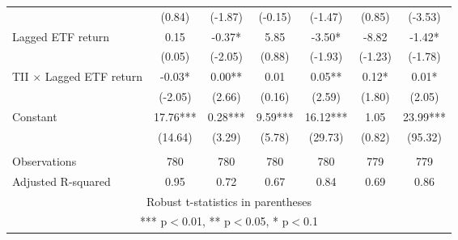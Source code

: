 \documentclass[]{article}
\begin{document}
\begin{tabular}{lcccccc}
 & (0.84) & (-1.87) & (-0.15) & (-1.47) & (0.85) & (-3.53) \\
Lagged ETF return & 0.15 & -0.37* & 5.85 & -3.50* & -8.82 & -1.42* \\
 & (0.05) & (-2.05) & (0.88) & (-1.93) & (-1.23) & (-1.78) \\
TII $\times$ Lagged ETF return & -0.03* & 0.00** & 0.01 & 0.05** & 0.12* & 0.01* \\
 & (-2.05) & (2.66) & (0.16) & (2.59) & (1.80) & (2.05) \\
Constant & 17.76*** & 0.28*** & 9.59*** & 16.12*** & 1.05 & 23.99*** \\
 & (14.64) & (3.29) & (5.78) & (29.73) & (0.82) & (95.32) \\
 &  &  &  &  &  &  \\
Observations & 780 & 780 & 780 & 780 & 779 & 779 \\
 Adjusted R-squared & 0.95 & 0.72 & 0.67 & 0.84 & 0.69 & 0.86 \\ \hline
\multicolumn{7}{c}{ Robust t-statistics in parentheses} \\
\multicolumn{7}{c}{ *** p$<$0.01, ** p$<$0.05, * p$<$0.1} \\
\end{tabular}
\end{document}
